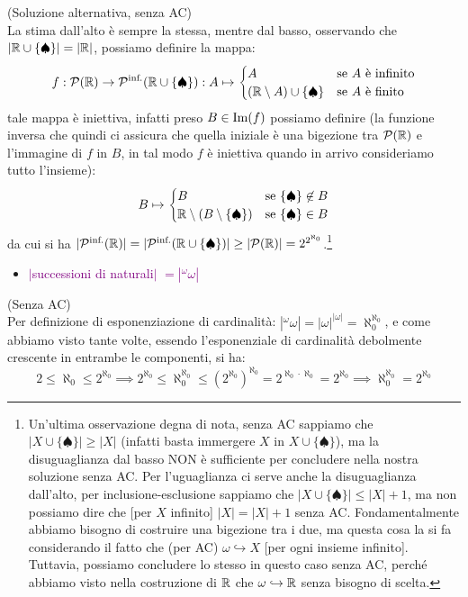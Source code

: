 \begin{soln}
	(Soluzione alternativa, senza AC)\\
	La stima dall'alto è sempre la stessa, mentre dal basso, osservando che $|\mathbb R \cup \{\spadesuit\}| = |\mathbb R|$, possiamo definire la mappa:
	\[ f : \mathcal{P}(\mathbb R) \to \mathcal{P}^{\text{inf.}}(\mathbb R \cup \{\spadesuit\}) : A \mapsto \begin{cases}
		A &\text{se $A$ è infinito} \\
		(\mathbb R \setminus A) \cup \{\spadesuit\} &\text{se $A$ è finito}
	\end{cases}
		\]
	tale mappa è iniettiva, infatti preso $B \in \operatorname{Im}(f)$ possiamo definire (la funzione inversa che quindi ci assicura che quella iniziale è una bigezione tra $\mathcal{P}(\mathbb R)$ e l'immagine di $f$ in $B$, in tal modo $f$ è iniettiva quando in arrivo consideriamo tutto l'insieme):
	\[ B \mapsto \begin{cases}
		B &\text{se $\{\spadesuit\} \not \in B$} \\
		\mathbb R \setminus (B \setminus \{\spadesuit\}) &\text{se $\{\spadesuit\} \in B$}
	\end{cases}
		\]
	da cui si ha $|\mathcal{P}^{\text{inf.}}(\mathbb R)| = |\mathcal{P}^{\text{inf.}}(\mathbb R \cup \{\spadesuit\})| \geq |\mathcal{P}(\mathbb R)| = 2^{2^{\aleph_0}}$.\footnote{Un'ultima osservazione degna di nota, senza AC sappiamo che $|X \cup \{\spadesuit\}| \geq |X|$ (infatti basta immergere $X$ in $X \cup \{\spadesuit\}$), ma la disuguaglianza dal basso NON è sufficiente per concludere nella nostra soluzione senza AC.
	Per l'uguaglianza ci serve anche la disuguaglianza dall'alto, per inclusione-esclusione sappiamo che $|X \cup \{\spadesuit\}| \leq |X| + 1$, ma non possiamo dire che [per $X$ infinito] $|X| = |X| + 1$ senza AC. Fondamentalmente abbiamo bisogno di costruire una bigezione tra i due, ma questa cosa la si fa considerando il fatto che (per AC) $\omega \hookrightarrow X$ [per ogni insieme infinito]. Tuttavia, possiamo concludere lo stesso in questo caso senza AC, perché abbiamo visto nella costruzione di $\mathbb R$ che $\omega \hookrightarrow \mathbb R$ senza bisogno di scelta.}
\end{soln}

\begin{itemize}
	\item \textcolor{purple}{$|$successioni di naturali$|$ $= |{}^\omega \omega|$}
\end{itemize}

\begin{soln}
	(Senza AC)\\
	Per definizione di esponenziazione di cardinalità: $|{}^\omega \omega| = |\omega|^{|\omega|} = \aleph_0^{\aleph_0}$, e come abbiamo visto tante volte, essendo l'esponenziale di cardinalità debolmente crescente in entrambe le componenti, si ha:
	\[ 2 \leq \aleph_0 \leq 2^{\aleph_0} \implies 2^{\aleph_0} \leq \aleph_0^{\aleph_0} \leq (2^{\aleph_0})^{\aleph_0} = 2^{\aleph_0 \cdot \aleph_0} = 2^{\aleph_0} \implies \aleph_0^{\aleph_0} = 2^{\aleph_0}
		\]
\end{soln}

